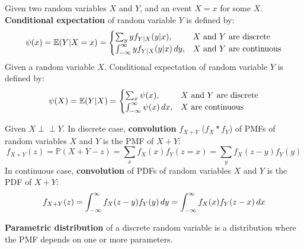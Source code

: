 \documentclass{huhtakm-template-book}
\newcommand{\independent}{\perp\!\!\!\perp}
\newcommand{\prob}{\mathbb{P}}
\newcommand{\expect}{\mathbb{E}}
\begin{document}
\begin{sdefn}
	Given two random variables $X$ and $Y$, and an event $X=x$ for some $X$. \textbf{Conditional expectation} of random variable $Y$ is defined by:
	\begin{equation*}
		\psi(x)=\expect(Y|X=x)=\begin{cases}
			\sum_{y}yf_{Y|X}(y|x), &X\text{ and }Y\text{ are discrete}\\
			\intinfty yf_{Y|X}(y|x)\,dy, &X\text{ and }Y\text{ are continuous}
		\end{cases}
	\end{equation*}
	Given a random variable $X$. Conditional expectation of random variable $Y$ is defined by:
	\begin{equation*}
		\psi(X)=\expect(Y|X)=\begin{cases}
			\sum_{x}\psi(x), &X\text{ and }Y\text{ are discrete}\\
			\intinfty\psi(x)\,dx, &X\text{ are continuous}
		\end{cases}
	\end{equation*}
\end{sdefn}
\begin{sdefn}
	Given $X\independent Y$. In discrete case, \textbf{convolution} $f_{X+Y}$ ($f_{X}*f_{Y}$) of PMFs of random variables $X$ and $Y$ is the PMF of $X+Y$:
	\begin{equation*}
		f_{X+Y}(z)=\prob(X+Y-z)=\sum_{x}f_{X}(x)f_{Y}(z=x)=\sum_{y}f_{X}(z-y)f_{Y}(y)
	\end{equation*}
	In continuous case, \textbf{convolution} of PDFs of random variables $X$ and $Y$ is the PDF of $X+Y$:
	\begin{equation*}
		f_{X+Y}(z)=\int_{-\infty}^{\infty} f_{X}(z-y)f_{Y}(y)\,dy=\int_{-\infty}^{\infty} f_{X}(x)f_{Y}(z-x)\,dx
	\end{equation*}
\end{sdefn}
\begin{sdefn}
	\textbf{Parametric distribution} of a discrete random variable is a distribution where the PMF depends on one or more parameters.
\end{sdefn}

\newpage
\end{document}
